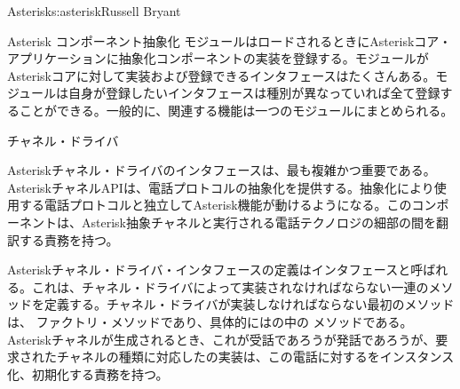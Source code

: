 \begin{aosachapter}{Asterisk}{s:asterisk}{Russell Bryant}
\begin{aosasect1}{Asterisk コンポーネント抽象化}
モジュールはロードされるときにAsteriskコア・アプリケーションに抽象化コンポーネントの実装を登録する。モジュールがAsteriskコアに対して実装および登録できるインタフェースはたくさんある。モジュールは自身が登録したいインタフェースは種別が異なっていれば全て登録することができる。一般的に、関連する機能は一つのモジュールにまとめられる。

\begin{aosasect2}{チャネル・ドライバ}
\label{sec.asterisk.drivers}

Asteriskチャネル・ドライバのインタフェースは、最も複雑かつ重要である。AsteriskチャネルAPIは、電話プロトコルの抽象化を提供する。抽象化により使用する電話プロトコルと独立してAsterisk機能が動けるようになる。このコンポーネントは、Asterisk抽象チャネルと実行される電話テクノロジの細部の間を翻訳する責務を持つ。

Asteriskチャネル・ドライバ・インタフェースの定義はインタフェースと呼ばれる。これは、チャネル・ドライバによって実装されなければならない一連のメソッドを定義する。チャネル・ドライバが実装しなければならない最初のメソッドは、 ファクトリ・メソッドであり、具体的にはの中の メソッドである。Asteriskチャネルが生成されるとき、これが受話であろうが発話であろうが、要求されたチャネルの種類に対応したの実装は、この電話に対するをインスタンス化、初期化する責務を持つ。


\end{aosasect2}
\end{aosasect1}
\end{aosachapter}
